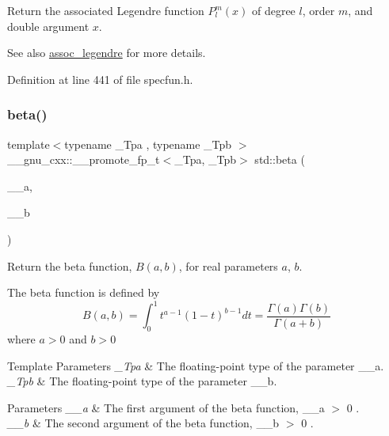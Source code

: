 Return the associated Legendre function $ P_l^m(x) $ of degree $ l $, order $ m $, and { double} argument $ x $.

\begin{DoxySeeAlso}{See also}
\hyperlink{group__tr29124__math__spec__func_ga9df2525c1155eb8539e85323f18361a3}{assoc\+\_\+legendre} for more details. 
\end{DoxySeeAlso}


Definition at line 441 of file specfun.\+h.

\mbox{\label{group__tr29124__math__spec__func_gaffed6cf5d5e3daf3e2c3a936bc0a33e7}} 
\subsubsection{\texorpdfstring{beta()}{beta()}}
{\footnotesize\ttfamily template$<$typename \+\_\+\+Tpa , typename \+\_\+\+Tpb $>$ \\
\+\_\+\+\_\+gnu\+\_\+cxx\+::\+\_\+\+\_\+promote\+\_\+fp\+\_\+t$<$\+\_\+\+Tpa, \+\_\+\+Tpb$>$ std\+::beta (\begin{DoxyParamCaption}\item[{\+\_\+\+Tpa}]{\+\_\+\+\_\+a,  }\item[{\+\_\+\+Tpb}]{\+\_\+\+\_\+b }\end{DoxyParamCaption})\hspace{0.3cm}{\ttfamily [inline]}}

Return the beta function, $B(a,b)$, for real parameters $ a $, $ b $.

The beta function is defined by \[ B(a,b) = \int_0^1 t^{a - 1} (1 - t)^{b - 1} dt = \frac{\Gamma(a)\Gamma(b)}{\Gamma(a+b)} \] where $ a > 0 $ and $ b > 0 $


\begin{DoxyTemplParams}{Template Parameters}
{\em \+\_\+\+Tpa} & The floating-\/point type of the parameter {\ttfamily \+\_\+\+\_\+a}. \\
\hline
{\em \+\_\+\+Tpb} & The floating-\/point type of the parameter {\ttfamily \+\_\+\+\_\+b}. \\
\hline
\end{DoxyTemplParams}

\begin{DoxyParams}{Parameters}
{\em \+\_\+\+\_\+a} & The first argument of the beta function, {\ttfamily  \+\_\+\+\_\+a $>$ 0 }. \\
\hline
{\em \+\_\+\+\_\+b} & The second argument of the beta function, {\ttfamily  \+\_\+\+\_\+b $>$ 0 }. \\
\hline
\end{DoxyParams}


